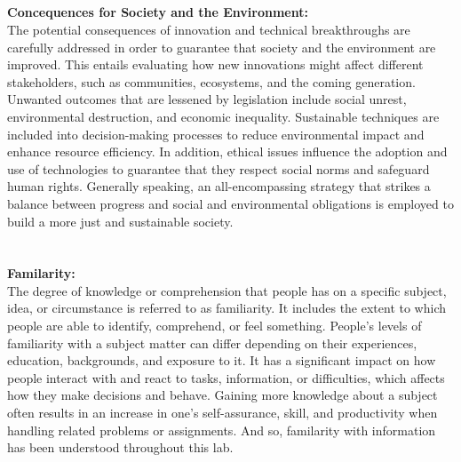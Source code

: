 \documentclass[a4paper,14pt]{report}
\begin{document}
\\
\\
\\
\\
\textbf{Concequences for Society and the Environment:}
\\
The potential consequences of innovation and technical breakthroughs are carefully addressed in order to guarantee that society and the environment are improved. This entails evaluating how new innovations might affect different stakeholders, such as communities, ecosystems, and the coming generation. Unwanted outcomes that are lessened by legislation include social unrest, environmental destruction, and economic inequality. Sustainable techniques are included into decision-making processes to reduce environmental impact and enhance resource efficiency. In addition, ethical issues influence the adoption and use of technologies to guarantee that they respect social norms and safeguard human rights. Generally speaking, an all-encompassing strategy that strikes a balance between progress and social and environmental obligations is employed to build a more just and sustainable society.
\\
\\
\\
\textbf{Familarity:}
\\
The degree of knowledge or comprehension that people has on a specific subject, idea, or circumstance is referred to as familiarity. It includes the extent to which people are able to identify, comprehend, or feel something. People's levels of familiarity with a subject matter can differ depending on their experiences, education, backgrounds, and exposure to it. It has a significant impact on how people interact with and react to tasks, information, or difficulties, which affects how they make decisions and behave. Gaining more knowledge about a subject often results in an increase in one's self-assurance, skill, and productivity when handling related problems or assignments. And so, familarity with information has been understood throughout this lab.
\end{document}
